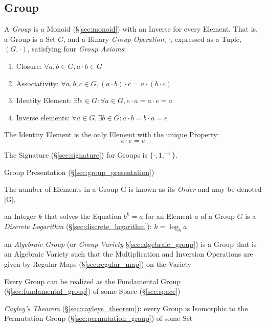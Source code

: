 


\subsection{Group}\label{sec:group}

A \emph{Group} is a Monoid (\S\ref{sec:monoid}) with an Inverse for
every Element. That is, a Group is a Set $G$, and a Binary \emph{Group
  Operation}, $\cdot$, expressed as a Tuple, $(G,\cdot)$, satisfying
four \emph{Group Axioms}:
\begin{enumerate}
    \item Closure: $\forall a,b \in G, a \cdot b \in G$
    \item Associativity: $\forall a,b,c \in G, (a \cdot b) \cdot c = a
      \cdot (b \cdot c)$
    \item Identity Element: $\exists! e \in G : \forall a \in G,
      e \cdot a = a \cdot e = a$
    \item Inverse elements: $\forall a \in G, \exists b \in G :
      a \cdot b = b \cdot a = e$
\end{enumerate}
The Identity Element is the only Element with the unique Property:
\[
    e \cdot e = e
\]

The Signature (\S\ref{sec:signature}) for Groups is $\{\cdot, 1,
^{-1}\}$.

\fist Group Presentation (\S\ref{sec:group_presentation})

The number of Elements in a Group $\mathrm{G}$ is known as its
\emph{Order} and may be denoted $|\mathrm{G}|$.

an Integer $k$ that solves the Equation $b^k = a$ for an Element $a$ of a Group
$G$ is a \emph{Discrete Logarithm} (\S\ref{sec:discrete_logarithm}): $k =
\log_b a$

an \emph{Algebraic Group} (or \emph{Group Variety} \S\ref{sec:algebraic_group})
is a Group that is an Algebraic Variety such that the Multiplication and
Inversion Operations are given by Regular Maps (\S\ref{sec:regular_map}) on the
Variety

Every Group can be realized as the Fundamental Group
(\S\ref{sec:fundamental_group}) of some Space (\S\ref{sec:space})

\emph{Cayley's Theorem} (\S\ref{sec:cayleys_theorem}): every Group is
Isomorphic to the Permutation Group (\S\ref{sec:permutation_group}) of
some Set

